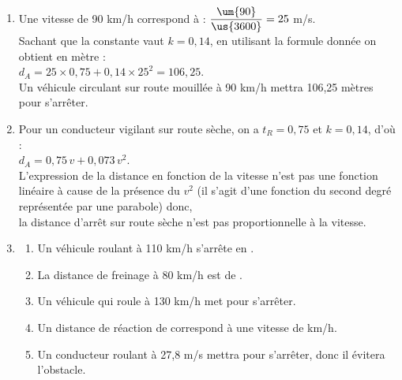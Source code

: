 \begin{corrige}
\ \\ [-5mm]
   \begin{enumerate}
      \item Une vitesse de 90 km/h correspond à : $\dfrac{\um{90}}{\us{3600}} =25$ m/s. \\ [1mm]
         Sachant que la constante vaut $k =0,14$, en utilisant la formule donnée on obtient en mètre : \\
         $d_A =25\times0,75+0,14\times25^2 =106,25$. \\
         {\blue Un véhicule circulant sur route mouillée à 90 km/h mettra 106,25 mètres pour s'arrêter}. \\
      \item Pour un conducteur vigilant sur route sèche, on a $t_R =0,75$ et $k =0,14$, d'où : \\
   $d_A =0,75\,v+0,073\,v^2$. \\
          L'expression de la distance en fonction de la vitesse n'est pas une fonction linéaire à cause de la présence du \og $v^2$ \fg{} (il s'agit d'une fonction du second degré représentée par une parabole) donc, \\
         {\blue la distance d'arrêt sur route sèche n'est pas proportionnelle à la vitesse.}
   \item
      \begin{enumerate}
          \item Un véhicule roulant à 110 km/h s'arrête en {\blue {}}.
          \item La distance de freinage à 80 km/h est de {\blue {}}.
          \item Un véhicule qui roule à 130 km/h met {\blue {}} pour s'arrêter.
          \item Un distance de réaction de  correspond à une vitesse de { km/h.}
          \item Un conducteur roulant à 27,8 m/s mettra  pour s'arrêter, donc {\blue il évitera l'obstacle}.
      \end{enumerate}
   \end{enumerate}
\end{corrige}

\bigskip



